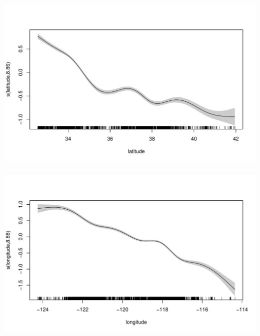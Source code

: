 \documentclass[xetex,mathserif,serif,aspectratio=169]{beamer}
\begin{document}
\begin{frame}[fragile] \frametitle{} \oldB \small

\begin{center}
\includegraphics[width=\textwidth]{img/gamRug10.pdf}
\end{center}

\end{frame}

\begin{frame}[fragile] \frametitle{} \oldB \small

\begin{center}
\includegraphics[width=\textwidth]{img/gamRug11.pdf}
\end{center}

\end{frame}
\end{document}
